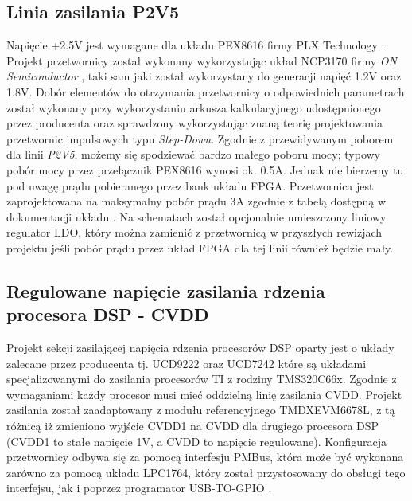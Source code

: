 \subsection{Linia zasilania P2V5}
Napięcie +2.5V jest wymagane dla układu PEX8616 \cite{PEX8616} firmy PLX Technology \cite{COMPANY:PLX}. Projekt przetwornicy został wykonany wykorzystując układ NCP3170 \cite{NCP3170} firmy \textit{ON Semiconductor} \cite{COMPANY:ON}, taki sam jaki został wykorzystany do generacji napięć  1.2V oraz 1.8V. Dobór elementów do otrzymania przetwornicy o odpowiednich parametrach został wykonany przy wykorzystaniu arkusza kalkulacyjnego udostępnionego przez producenta oraz sprawdzony wykorzystując znaną teorię projektowania przetwornic impulsowych typu \textit{Step-Down}. Zgodnie z przewidywanym poborem dla linii \textit{P2V5}, możemy się spodziewać bardzo małego poboru mocy; typowy pobór mocy przez przełącznik PEX8616 wynosi ok. 0.5A. Jednak nie bierzemy tu pod uwagę prądu pobieranego przez bank układu FPGA. Przetwornica jest zaprojektowana na maksymalny pobór prądu 3A zgodnie z tabelą dostępną w dokumentacji układu \cite[str. 19]{NCP3170}. Na schematach został opcjonalnie umieszczony liniowy regulator LDO, który można zamienić z przetwornicą w przyszłych rewizjach projektu jeśli pobór prądu przez układ FPGA dla tej linii również będzie mały.

\subsection{Regulowane napięcie zasilania rdzenia procesora DSP - CVDD}
Projekt sekcji zasilającej napięcia rdzenia procesorów DSP  oparty jest o układy zalecane przez producenta \cite{DSP:HDG} tj. UCD9222 oraz UCD7242 które są układami specjalizowanymi do zasilania procesorów TI z rodziny TMS320C66x. Zgodnie z wymaganiami każdy procesor musi mieć oddzielną linię zasilania CVDD. Projekt zasilania został zaadaptowany z modułu referencyjnego TMDXEVM6678L, z tą różnicą iż zmieniono wyjście CVDD1 na CVDD dla drugiego procesora DSP (CVDD1 to stałe napięcie 1V, a CVDD to napięcie regulowane). Konfiguracja przetwornicy odbywa się za pomocą interfesju PMBus, która może być wykonana zarówno za pomocą układu LPC1764, który został przystosowany do obsługi tego interfejsu, jak i poprzez programator USB-TO-GPIO \cite{GPIO}.


